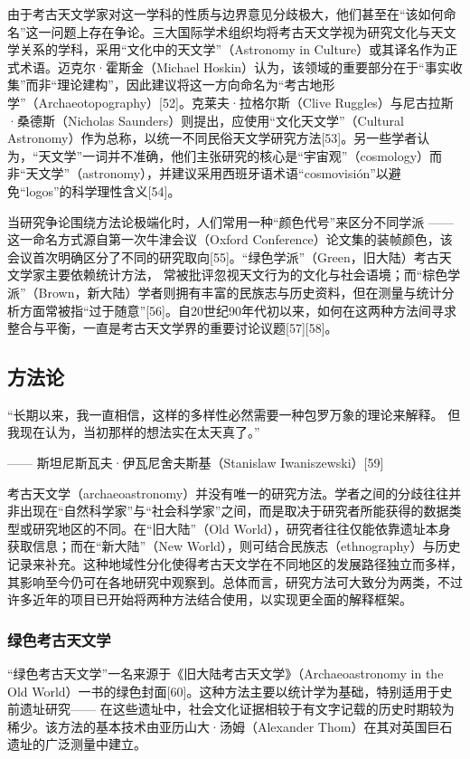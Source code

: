 由于考古天文学家对这一学科的性质与边界意见分歧极大，他们甚至在“该如何命名”这一问题上存在争论。三大国际学术组织均将考古天文学视为研究文化与天文学关系的学科，采用“文化中的天文学”（Astronomy in Culture）或其译名作为正式术语。迈克尔·霍斯金（Michael Hoskin）认为，该领域的重要部分在于“事实收集”而非“理论建构”，因此建议将这一方向命名为“考古地形学”（Archaeotopography）[52]。克莱夫·拉格尔斯（Clive Ruggles）与尼古拉斯·桑德斯（Nicholas Saunders）则提出，应使用“文化天文学”（Cultural Astronomy）作为总称，以统一不同民俗天文学研究方法[53]。另一些学者认为，“天文学”一词并不准确，他们主张研究的核心是“宇宙观”（cosmology）而非“天文学”（astronomy），并建议采用西班牙语术语“cosmovisión”以避免“logos”的科学理性含义[54]。

当研究争论围绕方法论极端化时，人们常用一种“颜色代号”来区分不同学派 —— 这一命名方式源自第一次牛津会议（Oxford Conference）论文集的装帧颜色，该会议首次明确区分了不同的研究取向[55]。“绿色学派”（Green，旧大陆）考古天文学家主要依赖统计方法，  
常被批评忽视天文行为的文化与社会语境；而“棕色学派”（Brown，新大陆）学者则拥有丰富的民族志与历史资料，但在测量与统计分析方面常被指“过于随意”[56]。自20世纪90年代初以来，如何在这两种方法间寻求整合与平衡，一直是考古天文学界的重要讨论议题[57][58]。
\subsection{方法论}
“长期以来，我一直相信，这样的多样性必然需要一种包罗万象的理论来解释。  
但我现在认为，当初那样的想法实在太天真了。”

—— 斯坦尼斯瓦夫·伊瓦尼舍夫斯基（Stanislaw Iwaniszewski）[59]

考古天文学（archaeoastronomy）并没有唯一的研究方法。学者之间的分歧往往并非出现在“自然科学家”与“社会科学家”之间，而是取决于研究者所能获得的数据类型或研究地区的不同。在“旧大陆”（Old World），研究者往往仅能依靠遗址本身获取信息；而在“新大陆”（New World），则可结合民族志（ethnography）与历史记录来补充。这种地域性分化使得考古天文学在不同地区的发展路径独立而多样，其影响至今仍可在各地研究中观察到。总体而言，研究方法可大致分为两类，不过许多近年的项目已开始将两种方法结合使用，以实现更全面的解释框架。
\subsubsection{绿色考古天文学}
“绿色考古天文学”一名来源于《旧大陆考古天文学》（Archaeoastronomy in the Old World）一书的绿色封面[60]。这种方法主要以统计学为基础，特别适用于史前遗址研究—— 在这些遗址中，社会文化证据相较于有文字记载的历史时期较为稀少。该方法的基本技术由亚历山大·汤姆（Alexander Thom）在其对英国巨石遗址的广泛测量中建立。

